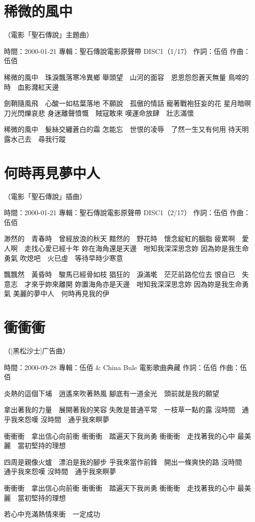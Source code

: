 \documentclass[UTF8,a4paper,oneside,twocolumn,12pt]{ctexbook}
\newcommand{\infopair}[2]{\textbullet #1：#2}
\newcommand{\zc}[1][伍佰]{\infopair{作詞}{#1}}
\newcommand{\zq}[1][伍佰]{\infopair{作曲}{#1}}
\newcommand{\zj}[1]{\infopair{專輯}{#1}}
\newcommand{\sj}[1]{\infopair{時間}{#1}}
\newenvironment{info}{\begin{flushleft}\kaishu
	}
	{\end{flushleft}\normalsize\yahei\par}
\newenvironment{lyric}{
	}
{}
\begin{document}
\section{稀微的風中}
\begin{info}
	（電影「聖石傳說」主題曲）

	\sj{2000-01-21}
	\zj{聖石傳說電影原聲帶 DISC1（1/17）}
	\zc
	\zq
\end{info}
\begin{lyric}
	稀微的風中　珠淚飄落寒冷異鄉
	舉頭望　山河的面容　恩恩怨怨蒼天無量
	鳥啼的時　血影濺紅天邊

	劍鞘隨風飛　心酸一如枯葉落地
	不願說　孤傲的情話
	寵著戰袍狂妄的花
	星月暗暝　刀光閃爍哀悲
	身迷離聲憤慨　賊寇敢來
	嘆運命放肆　壯志滿懷

	稀微的風中　髮絲交纏蒼白的霜
	怎能忘　世恨的凌辱　了然一生又有何用
	待天明露水己去　尋我行蹤
\end{lyric}

\section{何時再見夢中人}
\begin{info}
	（電影「聖石傳說」插曲）

	\sj{2000-01-21}
	\zj{聖石傳說電影原聲帶 DISC1（2/17）}
	\zc
	\zq
\end{info}
\begin{lyric}
	渺然的　青春時　曾經放浪的秋天
	黯然的　野花時　懷念綻紅的胭脂
	疲累啊　愛人啊　走找心愛已經十年
	妳在海角還是天邊　咁知我深深思念妳
	因為妳是我生命勇氣
	吹熄吧　火已虛　等待早時少寒意

	飄飄然　黃昏時　駿馬已經骨如枝
	猖狂的　淚滿墘　茫茫前路佗位去
	恨自已　失意志　才來乎妳來離開
	妳置海角亦是天邊　咁知我深深思念妳
	因為妳是我生命勇氣
	美麗的夢中人　何時再見我的伊
\end{lyric}

\section{衝衝衝}
\begin{info}
	（[黑松沙士]广告曲）

	\sj{2000-09-28}
	\zj{伍佰 \& China Bule 電影歌曲典藏}
	\zc
	\zq
\end{info}
\begin{lyric}
	炎熱的這個下埔　逍遙來吹著熱風
	腳底有一道金光　頭前就是我的願望

	拿出著我的力量　展開著我的笑容
	失敗是普通平常　一枝草一點的露
	沒時間　通乎我來怨嘆
	沒時間　通乎我來瞑夢

	衝衝衝　拿出信心向前衝
	衝衝衝　踏遍天下我尚勇
	衝衝衝　走找著我的心中
	最美麗　當初堅持的理想

	四周是親像火爐　漂泊是我的腳步
	乎我來當作前鋒　開出一條爽快的路
	沒時間　通乎我來怨嘆
	沒時間　通乎我來瞑夢

	衝衝衝　拿出信心向前衝
	衝衝衝　踏遍天下我尚勇
	衝衝衝　走找著我的心中
	最美麗　當初堅持的理想

	若心中充滿熱情來衝　一定成功
\end{lyric}
\end{document}
